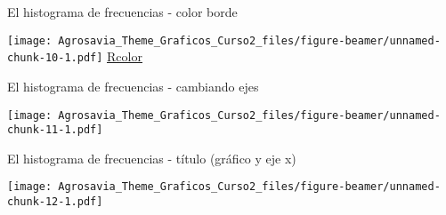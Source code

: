 \documentclass[ignorenonframetext,]{beamer}
\newenvironment{Shaded}{\begin{snugshade}}{\end{snugshade}}
\newcommand{\KeywordTok}[1]{\textcolor[rgb]{0.13,0.29,0.53}{\textbf{#1}}}
\newcommand{\DataTypeTok}[1]{\textcolor[rgb]{0.13,0.29,0.53}{#1}}
\newcommand{\DecValTok}[1]{\textcolor[rgb]{0.00,0.00,0.81}{#1}}
\newcommand{\StringTok}[1]{\textcolor[rgb]{0.31,0.60,0.02}{#1}}
\newcommand{\OperatorTok}[1]{\textcolor[rgb]{0.81,0.36,0.00}{\textbf{#1}}}
\newcommand{\NormalTok}[1]{#1}
\begin{document}
\begin{frame}[fragile]{El histograma de frecuencias - color borde}

\begin{Shaded}
\end{Shaded}

\texttt{[image: Agrosavia\_Theme\_Graficos\_Curso2\_files/figure-beamer/unnamed-chunk-10-1.pdf]}
\underline{\tiny{\textcolor{blue}{\href{http://www.stat.columbia.edu/~tzheng/files/Rcolor.pdf}{Rcolor}}}}

\end{frame}

\begin{frame}[fragile]{El histograma de frecuencias - cambiando ejes}

\begin{Shaded}
\end{Shaded}

\texttt{[image: Agrosavia\_Theme\_Graficos\_Curso2\_files/figure-beamer/unnamed-chunk-11-1.pdf]}

\end{frame}

\begin{frame}[fragile]{El histograma de frecuencias - título (gráfico y
eje x)}

\begin{Shaded}
\end{Shaded}

\texttt{[image: Agrosavia\_Theme\_Graficos\_Curso2\_files/figure-beamer/unnamed-chunk-12-1.pdf]}

\end{frame}
\end{document}
